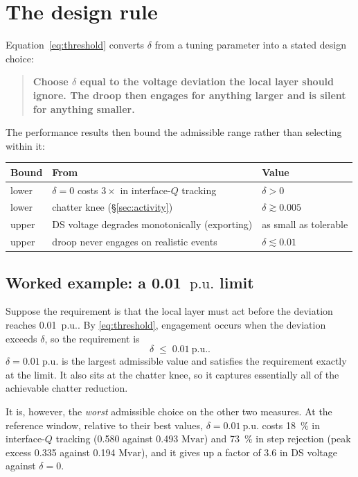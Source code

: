 \documentclass[11pt,a4paper]{article}
\newcommand{\pu}{\ensuremath{\mathrm{p.u.}}}
\newcommand{\Mvar}{\ensuremath{\mathrm{Mvar}}}
\newcommand{\dz}{\ensuremath{\delta}}
\begin{document}
\section{The design rule}
\label{sec:rule}

Equation~\eqref{eq:threshold} converts $\dz$ from a tuning parameter into a
stated design choice:

\begin{quote}
\textbf{Choose $\dz$ equal to the voltage deviation the local layer should
ignore. The droop then engages for anything larger and is silent for anything
smaller.}
\end{quote}

The performance results then bound the admissible range rather than selecting
within it:

\begin{center}
\begin{tabular}{lll}
\toprule
Bound & From & Value \\
\midrule
lower & $\dz=0$ costs $3\times$ in interface-$Q$ tracking & $\dz > 0$ \\
lower & chatter knee (\S\ref{sec:activity}) & $\dz \gtrsim 0.005$ \\
upper & DS voltage degrades monotonically (exporting) & as small as tolerable \\
upper & droop never engages on realistic events & $\dz \lesssim 0.01$ \\
\bottomrule
\end{tabular}
\end{center}

\subsection{Worked example: a \SI{0.01}{\pu} limit}

Suppose the requirement is that the local layer must act before the deviation
reaches \SI{0.01}{\pu}. By \eqref{eq:threshold}, engagement occurs when the
deviation exceeds $\dz$, so the requirement is
\[
  \dz \;\leq\; \SI{0.01}{\pu}.
\]
$\dz=\SI{0.01}{\pu}$ is the largest admissible value and satisfies the
requirement exactly at the limit. It also sits at the chatter knee, so it
captures essentially all of the achievable chatter reduction.

It is, however, the \emph{worst} admissible choice on the other two measures. At
the reference window, relative to their best values, $\dz=\SI{0.01}{\pu}$ costs
\SI{18}{\percent} in interface-$Q$ tracking (\num{0.580} against \num{0.493}
\si{\Mvar}) and \SI{73}{\percent} in step rejection (peak excess \num{0.335}
against \num{0.194} \si{\Mvar}), and it gives up a factor of $3.6$ in DS voltage
against $\dz=0$.
\end{document}
